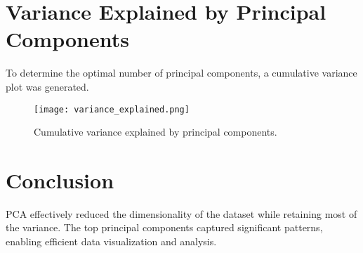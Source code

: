 \documentclass{article}
\begin{document}
\section*{Variance Explained by Principal Components}
To determine the optimal number of principal components, a cumulative variance plot was generated.

\begin{figure}[h!]
    \centering
    \texttt{[image: variance\_explained.png]}  %
    \caption{Cumulative variance explained by principal components.}
    \label{fig:variance_explained}
\end{figure}

\section*{Conclusion}
PCA effectively reduced the dimensionality of the dataset while retaining most of the variance. The top principal components captured significant patterns, enabling efficient data visualization and analysis.
\end{document}
